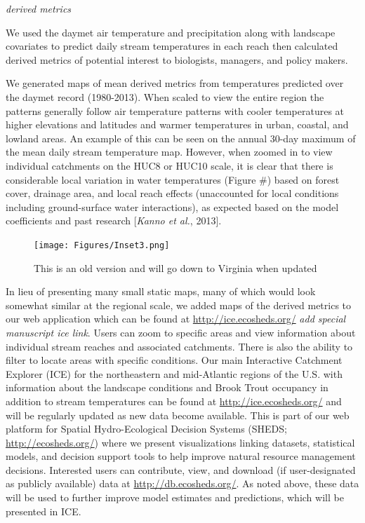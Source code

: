 \emph{derived metrics}

We used the daymet air temperature and precipitation along with
landscape covariates to predict daily stream temperatures in each reach
then calculated derived metrics of potential interest to biologists,
managers, and policy makers.

We generated maps of mean derived metrics from temperatures predicted
over the daymet record (1980-2013). When scaled to view the entire
region the patterns generally follow air temperature patterns with
cooler temperatures at higher elevations and latitudes and warmer
temperatures in urban, coastal, and lowland areas. An example of this
can be seen on the annual 30-day maximum of the mean daily stream
temperature map. However, when zoomed in to view individual catchments
on the HUC8 or HUC10 scale, it is clear that there is considerable local
variation in water temperatures (Figure \#) based on forest cover,
drainage area, and local reach effects (unaccounted for local conditions
including ground-surface water interactions), as expected based on the
model coefficients and past research {[}\emph{Kanno et al.}, 2013{]}.

\begin{figure}[htbp]
\centering
\texttt{[image: Figures/Inset3.png]}
\caption{This is an old version and will go down to Virginia when
updated}
\end{figure}

In lieu of presenting many small static maps, many of which would look
somewhat similar at the regional scale, we added maps of the derived
metrics to our web application which can be found at
\url{http://ice.ecosheds.org/} \emph{add special manuscript ice link}.
Users can zoom to specific areas and view information about individual
stream reaches and associated catchments. There is also the ability to
filter to locate areas with specific conditions. Our main Interactive
Catchment Explorer (ICE) for the northeastern and mid-Atlantic regions
of the U.S. with information about the landscape conditions and Brook
Trout occupancy in addition to stream temperatures can be found at
\url{http://ice.ecosheds.org/} and will be regularly updated as new data
become available. This is part of our web platform for Spatial
Hydro-Ecological Decision Systems (SHEDS; \url{http://ecosheds.org/})
where we present visualizations linking datasets, statistical models,
and decision support tools to help improve natural resource management
decisions. Interested users can contribute, view, and download (if
user-designated as publicly available) data at
\url{http://db.ecosheds.org/}. As noted above, these data will be used
to further improve model estimates and predictions, which will be
presented in ICE.

